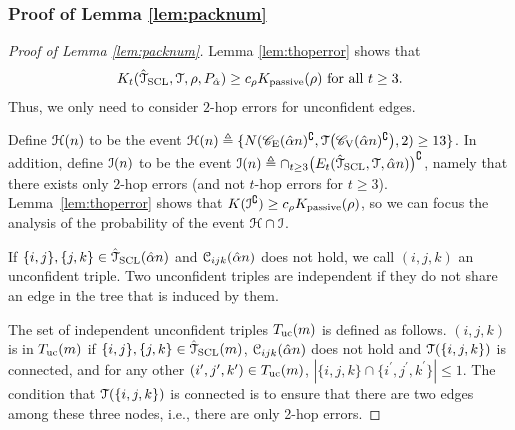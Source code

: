 \subsubsection{Proof of Lemma \ref{lem:packnum}}
\begin{proof}[Proof of Lemma \ref{lem:packnum}]
    Lemma \ref{lem:thoperror} shows that 
    \begin{align}
    	K _{t}(\hat{\mathcal{T}}_{{\rm SCL}},\mathcal{T},\rho,P_{\hat{\alpha}})\geq c_{\rho}K _{{\rm passive}}(\rho) \text{ for all }t\geq 3.
    \end{align}
    Thus, we only need to consider  $2$-hop errors for unconfident edges.

	Define $\mathcal{H}(n)$ to be the event $\mathcal{H}(n)\triangleq \{N(\mathscr{C}_{\mathrm{E}}(\hat{\alpha} n)^{\complement},\mathcal{T}\big(\mathscr{C}_{\mathrm{V}}(\hat{\alpha} n)^{\complement}\big),2)\geq 13\}$. In addition, define $\mathcal{I}(n)$ to be the event $\mathcal{I}(n)\triangleq\cap_{t\geq 3}\big(E_{t}(\hat{\mathcal{T}}_{{\rm SCL}},\mathcal{T},\hat{\alpha} n)\big)^{\complement}$, namely that there  exists only $2$-hop errors (and not $t$-hop errors for $t\ge 3$). 
	Lemma~\ref{lem:thoperror} shows that $K (\mathcal{I}^{\complement})\geq c_{\rho}K _{{\rm passive}}(\rho)$, so we can focus the analysis  of the probability of the event $\mathcal{H}\cap \mathcal{I}$. 
	
	If $\{i,j\},\{j,k\}\in \hat{\mathcal{T}}_{{\rm SCL}}(\hat{\alpha} n)$ and $\mathcal{C}_{ijk}(\hat{\alpha} n)$ does not hold, we call $(i,j,k)$ an unconfident triple. Two unconfident triples are independent if they do not  share an edge in the tree that is induced by them. %
	
	The set of independent unconfident triples $T_{{\rm uc}}(m)$ is defined as follows. $(i,j,k)$ is in $T_{{\rm uc}}(m)$ if $\{i,j\},\{j,k\}\in \hat{\mathcal{T}}_{{\rm SCL}}(m)$, $\mathcal{C}_{ijk}(\hat{\alpha} n)$ does not hold and $\mathcal{T}(\{i,j,k\})$ is connected, and for any other
	$(i^{\prime},j^{\prime},k^{\prime}) \in T_{{\rm uc}}(m)$, $|\{i,j,k\}\cap\{i^{\prime},j^{\prime},k^{\prime}\}|\leq 1$. The condition that $\mathcal{T}(\{i,j,k\})$ is connected is to ensure that there are two edges among these three nodes, i.e., there 
	are only 2-hop errors.
	

\end{proof}
